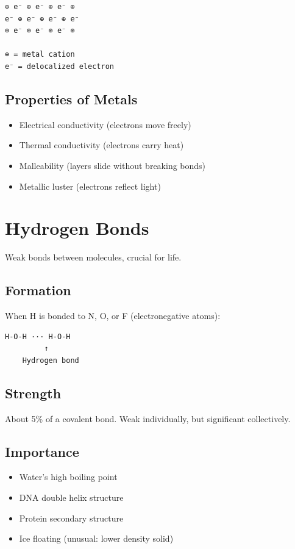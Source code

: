 \documentclass[
  11pt,
  letterpaper,
  twoside,
  openright]{book}
\providecommand{\tightlist}{%
  \setlength{\itemsep}{0pt}\setlength{\parskip}{0pt}}
\begin{document}
\begin{verbatim}
⊕ e⁻ ⊕ e⁻ ⊕ e⁻ ⊕
e⁻ ⊕ e⁻ ⊕ e⁻ ⊕ e⁻
⊕ e⁻ ⊕ e⁻ ⊕ e⁻ ⊕

⊕ = metal cation
e⁻ = delocalized electron
\end{verbatim}

\subsection{Properties of Metals}\label{properties-of-metals}

\begin{itemize}
\tightlist
\item
  Electrical conductivity (electrons move freely)
\item
  Thermal conductivity (electrons carry heat)
\item
  Malleability (layers slide without breaking bonds)
\item
  Metallic luster (electrons reflect light)
\end{itemize}

\section{Hydrogen Bonds}\label{hydrogen-bonds}

Weak bonds between molecules, crucial for life.

\subsection{Formation}\label{formation}

When H is bonded to N, O, or F (electronegative atoms):

\begin{verbatim}
H-O-H ··· H-O-H
         ↑
    Hydrogen bond
\end{verbatim}

\subsection{Strength}\label{strength}

About 5\% of a covalent bond. Weak individually, but significant
collectively.

\subsection{Importance}\label{importance}

\begin{itemize}
\tightlist
\item
  Water's high boiling point
\item
  DNA double helix structure
\item
  Protein secondary structure
\item
  Ice floating (unusual: lower density solid)
\end{itemize}
\end{document}
